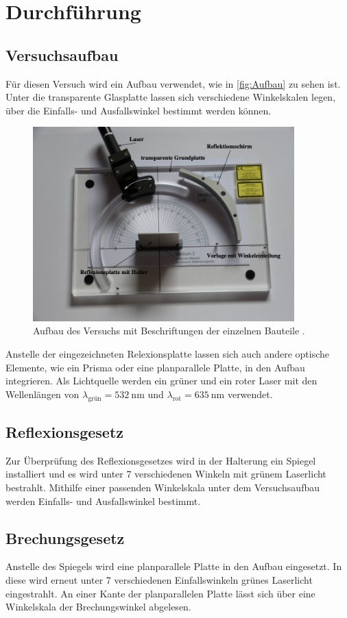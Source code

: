 \section{Durchführung}
\label{sec:Durchführung}
\subsection{Versuchsaufbau}
Für diesen Versuch wird ein Aufbau verwendet, wie in \autoref{fig:Aufbau} zu sehen ist. Unter die transparente Glasplatte
lassen sich verschiedene Winkelskalen legen, über die Einfalls- und Ausfallswinkel bestimmt werden können.
\begin{figure}[H]
    \centering
    \includegraphics[height=7.5cm]{content/pics/Aufbau_1.png}
    \caption{Aufbau des Versuchs mit Beschriftungen der einzelnen Bauteile \cite{v400}.}
    \label{fig:Aufbau}
\end{figure}
Anstelle der eingezeichneten Relexionsplatte lassen sich auch andere optische Elemente, wie ein Prisma oder eine
planparallele Platte, in den Aufbau integrieren.
Als Lichtquelle werden ein grüner und ein roter Laser mit den Wellenlängen von 
$\lambda_{\text{grün}} = \qty{532}{\nano\metre}$ und $\lambda_{\text{rot}} = \qty{635}{\nano\metre}$ verwendet.

\subsection{Reflexionsgesetz}
Zur Überprüfung des Reflexionsgesetzes wird in der Halterung ein Spiegel installiert und es wird unter 7 verschiedenen
Winkeln mit grünem Laserlicht bestrahlt. Mithilfe einer passenden Winkelskala unter dem Versuchsaufbau werden Einfalls-
und Ausfallswinkel bestimmt.

\subsection{Brechungsgesetz}
Anstelle des Spiegels wird eine planparallele Platte in den Aufbau eingesetzt. In diese wird erneut unter 7 verschiedenen
Einfallswinkeln grünes Laserlicht eingestrahlt. An einer Kante der planparallelen Platte lässt sich über eine Winkelskala
der Brechungswinkel abgelesen.

